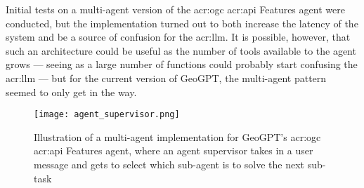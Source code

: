 Initial tests on a multi-agent version of the \acrshort{acr:ogc} \acrshort{acr:api} Features agent were conducted, but the implementation turned out to both increase the latency of the system and be a source of confusion for the \acrshort{acr:llm}. It is possible, however, that such an architecture could be useful as the number of tools available to the agent grows --- seeing as a large number of functions could probably start confusing the \acrshort{acr:llm} --- but for the current version of GeoGPT, the multi-agent pattern seemed to only get in the way.

\begin{figure}
    \centering
    \texttt{[image: agent\_supervisor.png]}
    \caption[Architecture a for multi-agent implementation for GeoGPT's OGC API Features agent]{Illustration of a multi-agent implementation for GeoGPT's \acrshort{acr:ogc} \acrshort{acr:api} Features agent, where an agent supervisor takes in a user message and gets to select which sub-agent is to solve the next sub-task}
    \label{fig:agent-supervisor}
\end{figure}
